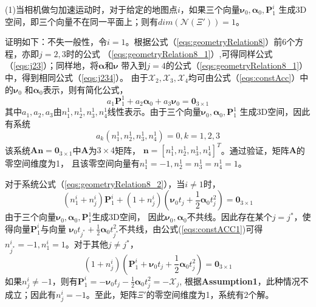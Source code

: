 \documentclass{article}
\begin{document}
\par
(1)当相机做匀加速运动时，对于给定的地图点$i$，如果三个向量$\mathbf{\nu}_0,\mathbf{\alpha}_0,\textbf{P}_1^i$
生成3D空间，即三个向量不在同一平面上；则有$dim(\mathcal{N}(\Xi'))=1$。
\par
证明如下：不失一般性，令$i=1$。根据公式（\ref{eqs:geometryRelation8}）前6个方程，亦即$j=2,3$时的公式
（\ref{eqs:geometryRelation8_1}）,可得同样公式（\ref{eqs:j23}）；同样地，将$\mathbf{\alpha}$和$\mathbf{\nu}$
带入到$j=4$的公式（\ref{eqs:geometryRelation8_1}）中，得到相同公式（\ref{eqs:j234}）。
由于$\mathcal{X}_2,\mathcal{X}_3,\mathcal{X}_4$均可由公式（\ref{eqs:constAcc}）中的$\mathbf{\nu}_{0}$
和$\mathbf{\alpha}_{0}$表示，则有简化公式，
\begin{equation}
    a_1\textbf{P}_1^1+a_2\mathbf{\alpha}_{0}+a_3\mathbf{\nu}_{0}=\textbf{0}_{3\times 1}
\end{equation}
其中$a_1,a_2,a_3$由$n_1^1,n_2^1,n_3^1,n_4^1$线性表示。由于三个向量$\mathbf{\nu}_0,\mathbf{\alpha}_0,\textbf{P}_1^1$
生成3D空间，因此有系统
\begin{equation}
    a_k(n_1^1,n_2^1,n_3^1,n_4^1)=0, k=1,2,3
\end{equation}
该系统$\textbf{A}\textbf{n}=\textbf{0}_{3\times 1}$中$\textbf{A}$为$3\times 4$矩阵，
$\textbf{n}=\left[n_1^1,n_2^1,n_3^1,n_4^1\right]^T$。通过验证，矩阵$\textbf{A}$的零空间维度为1，
且该零空间向量有$n_1^1=-1,n_2^1=n_3^1=n_4^1=1$。
\par
对于系统公式（\ref{eqs:geometryRelation8_2}），当$i\not=1$时，
\begin{equation}\label{eqs:constACC1}
    (n_1^i+n_j^i)\textbf{P}_1^i+(1+n_j^i)(\mathbf{\nu}_{0}t_j+\frac{1}{2}\mathbf{\alpha}_{0}t_j^2)=\textbf{0}_{3\times 1}
\end{equation}
由于三个向量$\mathbf{\nu}_0,\mathbf{\alpha}_0,\textbf{P}_1^1$生成3D空间，
因此$\mathbf{\nu}_0,\mathbf{\alpha}_0$不共线。因此存在某个$j=j^*$，使得向量$\textbf{P}_1^i$与向量
$\mathbf{\nu}_{0}t_{j^*}+\frac{1}{2}\mathbf{\alpha}_{0}t_{j^*}^2$不共线，由公式(\ref{eqs:constACC1})可得
$n_{j^*}^i=-1,n_1^i=1$。对于其他$j\not=j^*$，
\begin{equation}
    (1+n_j^i)(\textbf{P}_1^i+\mathbf{\nu}_{0}t_j+\frac{1}{2}\mathbf{\alpha}_{0}t_j^2)=\textbf{0}_{3\times 1}
\end{equation}
如果$n_j^i\not=-1$，则有$\textbf{P}_1^i=-\mathbf{\nu}_{0}t_j-\frac{1}{2}\mathbf{\alpha}_{0}t_j^2=-\mathcal{X}_j$,
根据\textbf{Assumption1}，此种情况不成立；因此有$n_j^i=-1$。至此，矩阵$\Xi'$的零空间维度为1，系统有2个解。
\end{document}
